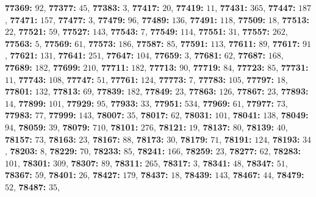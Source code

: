 \textsf{\bfseries 77369:} $92$, \textsf{\bfseries 77377:} $45$, \textsf{\bfseries 77383:} $3$, \textsf{\bfseries 77417:} $20$, \textsf{\bfseries 77419:} $11$, \textsf{\bfseries 77431:} $365$, \textsf{\bfseries 77447:} $187$, \textsf{\bfseries 77471:} $157$, \textsf{\bfseries 77477:} $3$, \textsf{\bfseries 77479:} $96$, \textsf{\bfseries 77489:} $136$, \textsf{\bfseries 77491:} $118$, \textsf{\bfseries 77509:} $18$, \textsf{\bfseries 77513:} $22$, \textsf{\bfseries 77521:} $59$, \textsf{\bfseries 77527:} $143$, \textsf{\bfseries 77543:} $7$, \textsf{\bfseries 77549:} $114$, \textsf{\bfseries 77551:} $31$, \textsf{\bfseries 77557:} $262$, \textsf{\bfseries 77563:} $5$, \textsf{\bfseries 77569:} $61$, \textsf{\bfseries 77573:} $186$, \textsf{\bfseries 77587:} $85$, \textsf{\bfseries 77591:} $113$, \textsf{\bfseries 77611:} $89$, \textsf{\bfseries 77617:} $91$, \textsf{\bfseries 77621:} $131$, \textsf{\bfseries 77641:} $251$, \textsf{\bfseries 77647:} $104$, \textsf{\bfseries 77659:} $3$, \textsf{\bfseries 77681:} $62$, \textsf{\bfseries 77687:} $168$, \textsf{\bfseries 77689:} $182$, \textsf{\bfseries 77699:} $210$, \textsf{\bfseries 77711:} $182$, \textsf{\bfseries 77713:} $90$, \textsf{\bfseries 77719:} $84$, \textsf{\bfseries 77723:} $85$, \textsf{\bfseries 77731:} $11$, \textsf{\bfseries 77743:} $108$, \textsf{\bfseries 77747:} $51$, \textsf{\bfseries 77761:} $124$, \textsf{\bfseries 77773:} $7$, \textsf{\bfseries 77783:} $105$, \textsf{\bfseries 77797:} $18$, \textsf{\bfseries 77801:} $132$, \textsf{\bfseries 77813:} $69$, \textsf{\bfseries 77839:} $182$, \textsf{\bfseries 77849:} $23$, \textsf{\bfseries 77863:} $126$, \textsf{\bfseries 77867:} $23$, \textsf{\bfseries 77893:} $14$, \textsf{\bfseries 77899:} $101$, \textsf{\bfseries 77929:} $95$, \textsf{\bfseries 77933:} $33$, \textsf{\bfseries 77951:} $534$, \textsf{\bfseries 77969:} $61$, \textsf{\bfseries 77977:} $73$, \textsf{\bfseries 77983:} $77$, \textsf{\bfseries 77999:} $143$, \textsf{\bfseries 78007:} $35$, \textsf{\bfseries 78017:} $62$, \textsf{\bfseries 78031:} $101$, \textsf{\bfseries 78041:} $138$, \textsf{\bfseries 78049:} $94$, \textsf{\bfseries 78059:} $39$, \textsf{\bfseries 78079:} $710$, \textsf{\bfseries 78101:} $276$, \textsf{\bfseries 78121:} $19$, \textsf{\bfseries 78137:} $80$, \textsf{\bfseries 78139:} $40$, \textsf{\bfseries 78157:} $73$, \textsf{\bfseries 78163:} $23$, \textsf{\bfseries 78167:} $88$, \textsf{\bfseries 78173:} $30$, \textsf{\bfseries 78179:} $71$, \textsf{\bfseries 78191:} $124$, \textsf{\bfseries 78193:} $34$, \textsf{\bfseries 78203:} $8$, \textsf{\bfseries 78229:} $70$, \textsf{\bfseries 78233:} $85$, \textsf{\bfseries 78241:} $166$, \textsf{\bfseries 78259:} $23$, \textsf{\bfseries 78277:} $62$, \textsf{\bfseries 78283:} $101$, \textsf{\bfseries 78301:} $309$, \textsf{\bfseries 78307:} $89$, \textsf{\bfseries 78311:} $265$, \textsf{\bfseries 78317:} $3$, \textsf{\bfseries 78341:} $48$, \textsf{\bfseries 78347:} $51$, \textsf{\bfseries 78367:} $59$, \textsf{\bfseries 78401:} $26$, \textsf{\bfseries 78427:} $179$, \textsf{\bfseries 78437:} $18$, \textsf{\bfseries 78439:} $143$, \textsf{\bfseries 78467:} $44$, \textsf{\bfseries 78479:} $52$, \textsf{\bfseries 78487:} $35$, 
